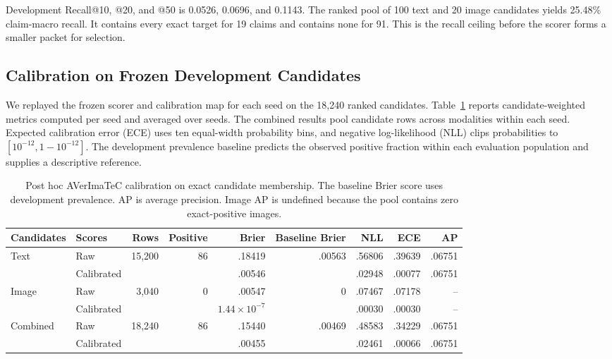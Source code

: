 Development Recall@10, @20, and @50 is 0.0526, 0.0696, and 0.1143. The ranked pool of 100 text and 20 image candidates yields 25.48\% claim-macro recall. It contains every exact target for 19 claims and contains none for 91. This is the recall ceiling before the scorer forms a smaller packet for selection.

\subsection{Calibration on Frozen Development Candidates}

We replayed the frozen scorer and calibration map for each seed on the 18,240 ranked candidates. Table~\ref{tab:external-cal} reports candidate-weighted metrics computed per seed and averaged over seeds. The combined results pool candidate rows across modalities within each seed. Expected calibration error (ECE) uses ten equal-width probability bins, and negative log-likelihood (NLL) clips probabilities to $[10^{-12},1-10^{-12}]$. The development prevalence baseline predicts the observed positive fraction within each evaluation population and supplies a descriptive reference.

\begin{table}[t]
\centering
\caption{Post hoc AVerImaTeC calibration on exact candidate membership. The baseline Brier score uses development prevalence. AP is average precision. Image AP is undefined because the pool contains zero exact-positive images.}
\label{tab:external-cal}
\small
\setlength{\tabcolsep}{4pt}
\begin{tabular}{llrrrrrrr}
\toprule
Candidates & Scores & Rows & Positive & Brier & Baseline Brier & NLL & ECE & AP \\
\midrule
Text & Raw & 15,200 & 86 & .18419 & .00563 & .56806 & .39639 & .06751 \\
 & Calibrated & & & .00546 & & .02948 & .00077 & .06751 \\
\addlinespace
Image & Raw & 3,040 & 0 & .00547 & 0 & .07467 & .07178 & -- \\
 & Calibrated & & & $1.44{\times}10^{-7}$ & & .00030 & .00030 & -- \\
\addlinespace
Combined & Raw & 18,240 & 86 & .15440 & .00469 & .48583 & .34229 & .06751 \\
 & Calibrated & & & .00455 & & .02461 & .00066 & .06751 \\
\bottomrule
\end{tabular}
\end{table}

